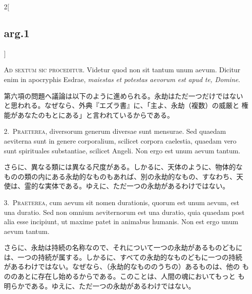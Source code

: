 \documentclass[paper=a4paper,fontsize=10pt,jafontsize=9pt,titlepage]{jlreq}
\begin{document}
{}
\setcounter{section}{6}
\setcounter{subsection}{0}

\begin{paracol}{2}[\subsection{arg.1}]

{\huge A}{\scshape d sextum sic proceditur}. Videtur quod non sit tantum unum
aevum. Dicitur enim in apocryphis Esdrae, {\itshape maiestas et potestas aevorum
est apud te, Domine}.

\switchcolumn

第六項の問題へ議論は以下のように進められる。永劫はただ一つだけではない
と思われる。なぜなら、外典『エズラ書』に、「主よ、永劫（複数）の威厳と
権能があなたのもとにある」と言われているからである。


2.~{\scshape Praeterea}, diversorum generum diversae sunt mensurae. Sed quaedam
aeviterna sunt in genere corporalium, scilicet corpora caelestia,
quaedam vero sunt spirituales substantiae, scilicet Angeli. Non ergo est
unum aevum tantum.

\switchcolumn

さらに、異なる類には異なる尺度がある。しかるに、天体のように、物体的な
ものの類の内にある永劫的なものもあれば、別の永劫的なもの、すなわち、天
使は、霊的な実体である。ゆえに、ただ一つの永劫があるわけではない。


3.~{\scshape Praeterea}, cum aevum sit nomen durationis, quorum est unum aevum, est
una duratio. Sed non omnium aeviternorum est una duratio, quia quaedam
post alia esse incipiunt, ut maxime patet in animabus humanis. Non est
ergo unum aevum tantum.

\switchcolumn

さらに、永劫は持続の名称なので、それについて一つの永劫があるものどもに
は、一つの持続が属する。しかるに、すべての永劫的なものどもに一つの持続
があるわけではない。なぜなら、（永劫的なもののうちの）あるものは、他の
もののあとに存在し始めるからである。このことは、人間の魂においてもっと
も明らかである。ゆえに、ただ一つの永劫があるわけではない。


\end{paracol}
\end{document}
